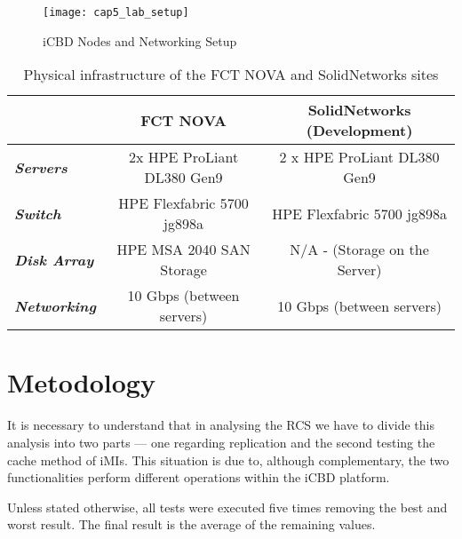 \begin{figure}[htbp]
	\centering
	\texttt{[image: cap5\_lab\_setup]}
	\caption{iCBD Nodes and Networking Setup}
	\label{fig:eval_setup}
\end{figure}

\begin{table}[htpb]
\centering
\begin{tabular}{lcc}
                             & \textbf{FCT NOVA}          & \textbf{SolidNetworks (Development)}              \\ \hline
\textit{\textbf{Servers}}    & 2x HPE ProLiant DL380 Gen9 & 2 x HPE ProLiant DL380 Gen9   \\
\textit{\textbf{Switch}}     & HPE Flexfabric 5700 jg898a & HPE Flexfabric 5700 jg898a    \\
\textit{\textbf{Disk Array}} & HPE MSA 2040 SAN Storage   & N/A - (Storage on the Server) \\
\textit{\textbf{Networking}} & 10 Gbps (between servers)  & 10 Gbps (between servers)     \\ \hline
\end{tabular}
\caption{Physical infrastructure of the FCT NOVA and SolidNetworks sites}
\end{table}


\section{Metodology}
\label{sec:eval_method}

It is necessary to understand that in analysing the RCS we have to divide this analysis into two parts — one regarding replication and the second testing the cache method of iMIs. This situation is due to, although complementary, the two functionalities perform different operations within the iCBD platform.


Unless stated otherwise, all tests were executed five times removing the best and worst result. The final result is the average of the remaining values. 



 




